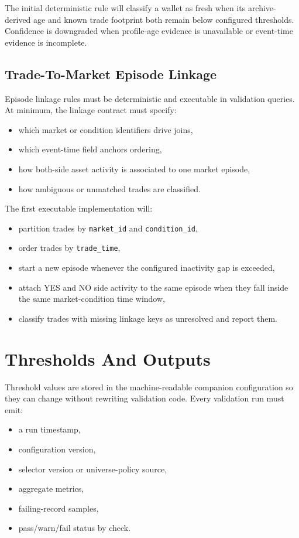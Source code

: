 \documentclass{article}
\begin{document}
The initial deterministic rule will classify a wallet as fresh when its
archive-derived age and known trade footprint both remain below configured
thresholds. Confidence is downgraded when profile-age evidence is unavailable or
event-time evidence is incomplete.

\subsection*{Trade-To-Market Episode Linkage}

Episode linkage rules must be deterministic and executable in validation
queries. At minimum, the linkage contract must specify:
\begin{itemize}
\item which market or condition identifiers drive joins,
\item which event-time field anchors ordering,
\item how both-side asset activity is associated to one market episode,
\item how ambiguous or unmatched trades are classified.
\end{itemize}

The first executable implementation will:
\begin{itemize}
\item partition trades by \texttt{market\_id} and \texttt{condition\_id},
\item order trades by \texttt{trade\_time},
\item start a new episode whenever the configured inactivity gap is exceeded,
\item attach YES and NO side activity to the same episode when they fall inside
the same market-condition time window,
\item classify trades with missing linkage keys as unresolved and report them.
\end{itemize}

\section*{Thresholds And Outputs}

Threshold values are stored in the machine-readable companion configuration so
they can change without rewriting validation code. Every validation run must
emit:
\begin{itemize}
\item a run timestamp,
\item configuration version,
\item selector version or universe-policy source,
\item aggregate metrics,
\item failing-record samples,
\item pass/warn/fail status by check.
\end{itemize}
\end{document}
